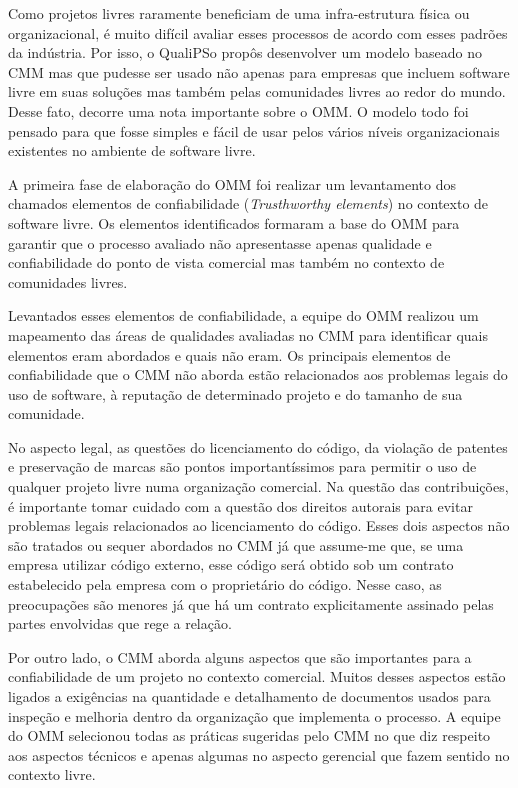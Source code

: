 Como projetos livres raramente beneficiam de uma infra-estrutura
física ou organizacional, é muito difícil avaliar esses processos de
acordo com esses padrões da indústria. Por isso, o QualiPSo propôs
desenvolver um modelo baseado no CMM mas que pudesse ser usado não
apenas para empresas que incluem software livre em suas soluções mas
também pelas comunidades livres ao redor do mundo. Desse fato, decorre
uma nota importante sobre o OMM. O modelo todo foi pensado para que
fosse simples e fácil de usar pelos vários níveis organizacionais
existentes no ambiente de software livre.

A primeira fase de elaboração do OMM foi realizar um levantamento dos
chamados elementos de confiabilidade (\textit{Trusthworthy elements})
no contexto de software livre. Os elementos identificados formaram a
base do OMM para garantir que o processo avaliado não apresentasse
apenas qualidade e confiabilidade do ponto de vista comercial mas
também no contexto de comunidades livres.

Levantados esses elementos de confiabilidade, a equipe do OMM realizou
um mapeamento das áreas de qualidades avaliadas no CMM para
identificar quais elementos eram abordados e quais não eram. Os
principais elementos de confiabilidade que o CMM não aborda estão
relacionados aos problemas legais do uso de software, à reputação de
determinado projeto e do tamanho de sua comunidade.

No aspecto legal, as questões do licenciamento do código, da violação
de patentes e preservação de marcas são pontos importantíssimos para
permitir o uso de qualquer projeto livre numa organização
comercial. Na questão das contribuições, é importante tomar cuidado
com a questão dos direitos autorais para evitar problemas legais
relacionados ao licenciamento do código. Esses dois aspectos não são
tratados ou sequer abordados no CMM já que assume-me que, se uma
empresa utilizar código externo, esse código será obtido sob um
contrato estabelecido pela empresa com o proprietário do código. Nesse
caso, as preocupações são menores já que há um contrato explicitamente
assinado pelas partes envolvidas que rege a relação.

Por outro lado, o CMM aborda alguns aspectos que são importantes para
a confiabilidade de um projeto no contexto comercial. Muitos desses
aspectos estão ligados a exigências na quantidade e detalhamento de
documentos usados para inspeção e melhoria dentro da organização que
implementa o processo. A equipe do OMM selecionou todas as práticas
sugeridas pelo CMM no que diz respeito aos aspectos técnicos e apenas
algumas no aspecto gerencial que fazem sentido no contexto livre.

